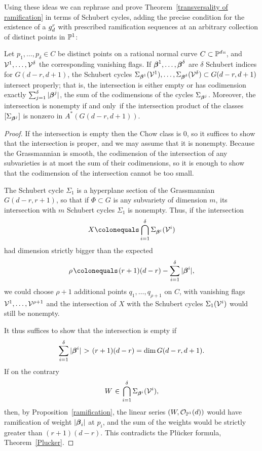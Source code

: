 Using these ideas we  can rephrase and prove Theorem~\ref{transversality
of ramification} in terms of Schubert cycles,
adding the precise condition for the existence of a $\grd$ with prescribed
ramification sequences
at an arbitrary collection of distinct points in $\PP^{1}$:

\begin{theorem}\label{osculating intersection}
Let $p_1,\dots,p_\delta \in C$ be distinct points on a rational normal
curve $C \subset \PP^d` `$, and ${\cal V}^1, \dots, {\cal V}^\delta$ the
corresponding vanishing flags. If ${\bbeta}^1, \dots, {\bbeta}^\delta$
are $\delta$ Schubert indices for $G(d-r, d+1)$, the Schubert cycles
$\Sigma_{{\bbeta}^1}({\cal V}^1), \dots, \Sigma_{{\bbeta}^\delta}({\cal
V}^\delta) \subset G(d-r, d+1)$ intersect properly; that is, the
intersection is either empty or has codimension exactly $\sum_{j
=1}^{\delta}|\bbeta^{j}|$,
the sum of the codimensions of the cycles $\Sigma_{{\bbeta}^j}$. Moreover,
the intersection is nonempty if and only~if
 the intersection product of the classes $[\Sigma_{{\bbeta}^j}]$ is
 nonzero in $A^*(G(d-r, d+1))$.
\end{theorem}


\begin{proof}
If the intersection is empty then the Chow class is 0, so it suffices
to show that the intersection is proper,
and we may assume that it is nonempty. Because the Grassmannian is smooth,
the codimension of the intersection of any subvarieties
 is at most the sum of their codimensions, so it is enough to show that
 the codimension of the
 intersection cannot be too small.

The Schubert cycle $\Sigma_1$ is a hyperplane section of the Grassmannian
$G(d-r, r+1)$, so that if $\Phi \subset G$ is any subvariety of
dimension $m$, its intersection with $m$ Schubert cycles $\Sigma_1$
is nonempty. Thus, if the intersection
$$
X \colonequals  \bigcap_{i=1}^\delta \Sigma_{{\bbeta}^i}({\cal V}^i)
$$
had dimension strictly bigger than the expected
$$
\rho \; \colonequals  \; (r+1)(d-r) - \sum_{i=1}^\delta |{\bbeta}^i|,
$$
we could choose $\rho + 1$ additional points $q_1,\dots,q_{\rho + 1}$
on $C$, with vanishing flags ${\cal V}^1, \dots, {\cal V}^{\rho + 1}$
and the intersection of $X$ with the Schubert cycles $\Sigma_1({\cal
V}^i)$ would still be nonempty.

It thus suffices to show that the intersection is empty if
$$
\sum_{i=1}^\delta |{\bbeta}^i| \; > \; (r+1)(d-r) = \dim G(d-r, d+1).
$$
If on the contrary
$$
W \; \in \; \bigcap_{i=1}^\delta \Sigma_{{\bbeta}^i}({\cal V}^i),
$$
then, by Proposition~\ref{ramification}, the linear series $(W,
\sO_{\PP^{1}}(d))$  would have
ramification of weight $|{\bbeta_i}|$ at $p_i$, and the sum of the
weights would be strictly greater than $(r+1)(d-r)$.
This contradicts the Pl\"ucker formula, Theorem~\ref{Plucker}.
\end{proof}

